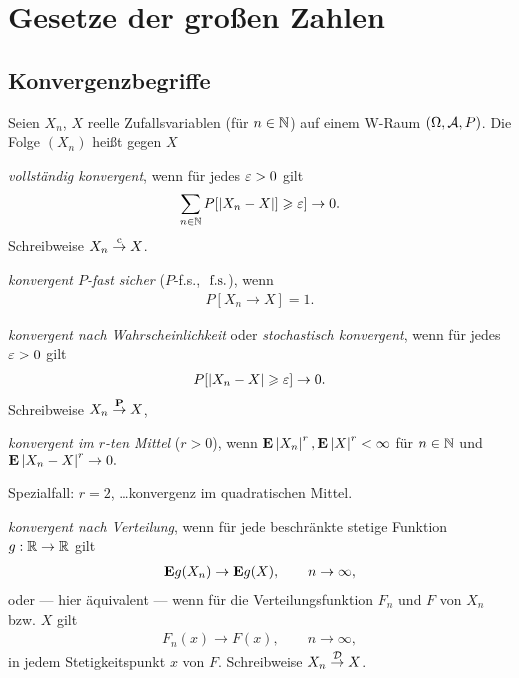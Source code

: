 \chapter{Gesetze der großen Zahlen}
\label{chap:8}

\section{Konvergenzbegriffe}

\begin{defn}
\label{defn:8.1}
Seien $X_n$, $X$ reelle Zufallsvariablen (für $n\in\N$) auf einem W-Raum
$(\Omega,\AA,P)$. Die Folge $(X_n)$ heißt gegen $X$
\begin{defnenum}
  \item \emph{vollständig konvergent}, wenn für jedes $\ep>0$ gilt
\begin{align*}
\sum_{n\in\N} P[\abs{X_n-X}] \ge \ep]\to 0.
\end{align*}
Schreibweise $X_n\cto X$.
\item \emph{konvergent $P$-fast sicher} ($P$-f.s., $\fs$), wenn
\begin{align*}
P[X_n\to X] = 1.
\end{align*}
\item \emph{konvergent nach Wahrscheinlichkeit} oder \emph{stochastisch
konvergent}, wenn für jedes $\ep > 0$ gilt
\begin{align*}
P[\abs{X_n-X}\ge \ep]\to 0.
\end{align*}
Schreibweise $X_n\Pto X$,
\item \emph{konvergent im $r$-ten Mittel} ($r>0$), wenn $\E \abs{X_n}^r, \E
\abs{X}^r < \infty$ für $n\in\N$ und
$
\E\abs{X_n-X}^r \to 0.
$

Spezialfall: $r=2$, \ldots konvergenz im quadratischen Mittel.
\item \emph{konvergent nach Verteilung}, wenn für jede beschränkte stetige
Funktion $g: \R\to\R$ gilt
\begin{align*}
\E g(X_n) \to \E g(X),\qquad n\to\infty,
\end{align*}
oder --- hier äquivalent --- wenn für die Verteilungsfunktion $F_n$ und $F$ von
$X_n$ bzw. $X$ gilt
\begin{align*}
F_n(x)\to F(x),\qquad n\to\infty,
\end{align*}
in jedem Stetigkeitspunkt $x$ von $F$. Schreibweise $X_n\Dto X$.\fishhere
\end{defnenum}
\end{defn}

